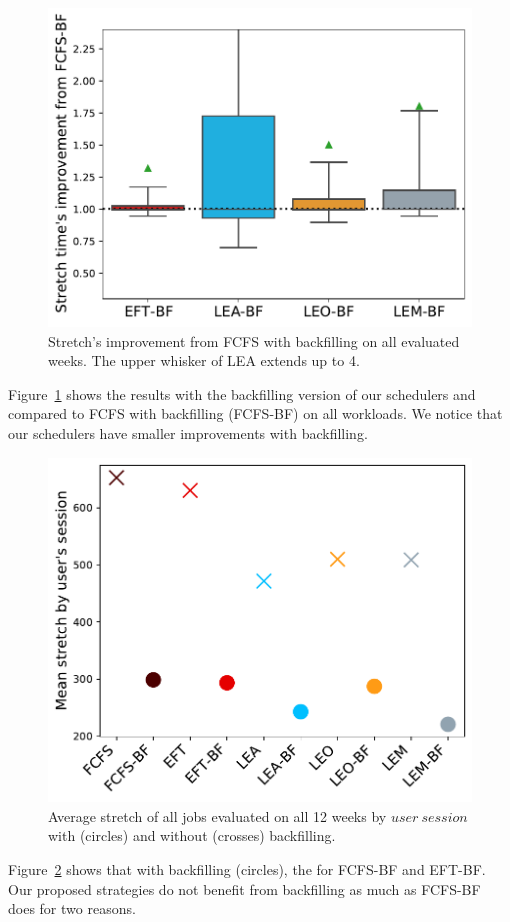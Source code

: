 \documentclass[sigconf,review,anonymous]{acmart}
\newcommand{\rev}[1]{{\color{black}{#1}}}
\newcommand{\us}{\ensuremath{\mathit{user~session}}\xspace}
\begin{document}
\paragraph{\rev{Results with backfilling}}
\begin{figure}[t]\centering\includegraphics[width=0.9\linewidth]{../MBSS/plot/Boxplot/byuser/box_plot_bf_stretch_all-all_1.pdf}\caption{Stretch's improvement from FCFS with backfilling on all evaluated weeks. The upper whisker of LEA extends up to 4.}\label{boxplot.all_bf}\end{figure}
Figure~\ref{boxplot.all_bf} shows the results with the backfilling version of our
schedulers and compared to FCFS with backfilling (FCFS-BF) on all workloads.
We notice that our schedulers have smaller improvements with backfilling.
\begin{figure}[t]\centering\includegraphics[width=0.9\linewidth]{../MBSS/plot/byuser/Mean_stretch_with_and_without_bf_all-all.pdf}\caption{Average stretch of all jobs evaluated on all 12 weeks by \us with (circles) and without (crosses) backfilling.}\label{bf_vs_non_bf}\end{figure}
Figure~\ref{bf_vs_non_bf} shows that
with backfilling (circles),
the \rev{difference of performance with or without backfilling is much higher} for FCFS-BF and EFT-BF. 
Our proposed strategies do not benefit from backfilling as much as FCFS-BF does for two reasons.
\end{document}

